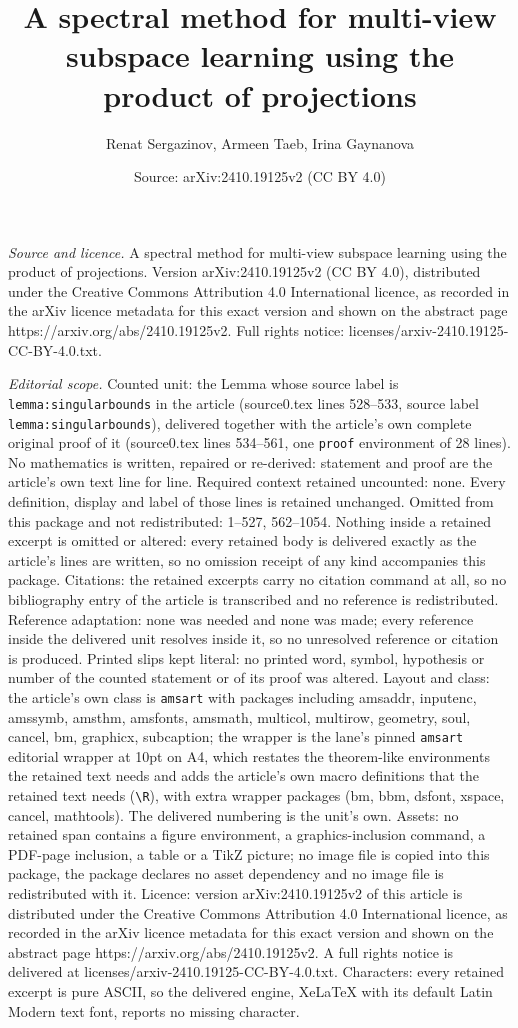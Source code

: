 \documentclass[10pt,a4paper]{amsart}
\title[A spectral method for multi-view subspace learning using the]{A spectral method for multi-view subspace learning using the product of projections}
\author{Renat Sergazinov, Armeen Taeb, Irina Gaynanova}
\date{Source: arXiv:2410.19125v2 (CC BY 4.0)}
\begin{document}
\maketitle

\noindent\emph{Source and licence.} A spectral method for multi-view subspace learning using the product of projections. Version arXiv:2410.19125v2 (CC BY 4.0), distributed under the Creative Commons Attribution 4.0 International licence, as recorded in the arXiv licence metadata for this exact version and shown on the abstract page https://arxiv.org/abs/2410.19125v2. Full rights notice: licenses/arxiv-2410.19125-CC-BY-4.0.txt.\par\smallskip

\noindent\textit{Editorial scope.} Counted unit: the Lemma whose source label is \texttt{lemma:singularbounds} in the article (source0.tex lines 528--533, source label \texttt{lemma:singularbounds}), delivered together with the article's own complete original proof of it (source0.tex lines 534--561, one \texttt{proof} environment of 28 lines). No mathematics is written, repaired or re-derived: statement and proof are the article's own text line for line. Required context retained uncounted: none. Every definition, display and label of those lines is retained unchanged. Omitted from this package and not redistributed: 1--527, 562--1054. Nothing inside a retained excerpt is omitted or altered: every retained body is delivered exactly as the article's lines are written, so no omission receipt of any kind accompanies this package. Citations: the retained excerpts carry no citation command at all, so no bibliography entry of the article is transcribed and no reference is redistributed. Reference adaptation: none was needed and none was made; every reference inside the delivered unit resolves inside it, so no unresolved reference or citation is produced. Printed slips kept literal: no printed word, symbol, hypothesis or number of the counted statement or of its proof was altered. Layout and class: the article's own class is \texttt{amsart} with packages including amsaddr, inputenc, amssymb, amsthm, amsfonts, amsmath, multicol, multirow, geometry, soul, cancel, bm, graphicx, subcaption; the wrapper is the lane's pinned \texttt{amsart} editorial wrapper at 10pt on A4, which restates the theorem-like environments the retained text needs and adds the article's own macro definitions that the retained text needs (\texttt{\textbackslash R}), with extra wrapper packages (bm, bbm, dsfont, xspace, cancel, mathtools). The delivered numbering is the unit's own. Assets: no retained span contains a figure environment, a graphics-inclusion command, a PDF-page inclusion, a table or a TikZ picture; no image file is copied into this package, the package declares no asset dependency and no image file is redistributed with it. Licence: version arXiv:2410.19125v2 of this article is distributed under the Creative Commons Attribution 4.0 International licence, as recorded in the arXiv licence metadata for this exact version and shown on the abstract page https://arxiv.org/abs/2410.19125v2. A full rights notice is delivered at licenses/arxiv-2410.19125-CC-BY-4.0.txt. Characters: every retained excerpt is pure ASCII, so the delivered engine, XeLaTeX with its default Latin Modern text font, reports no missing character.
\end{document}

